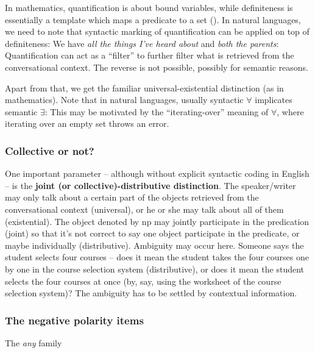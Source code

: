 \documentclass[UTF8, a4paper, oneside, scheme=plain, 12pt]{ctexbook}
\newcommand*{\concept}[1]{\textbf{#1}}
\newcommand{\form}[1]{\emph{#1}}
\begin{document}
In mathematics, quantification 
is about bound variables,
while definiteness 
is essentially a template which 
maps a predicate to a set ().
In natural languages, we need to note that 
syntactic marking of quantification can be applied on top of definiteness:
We have \form{all the things I've heard about} 
and \form{both the parents}:
Quantification can act as a ``filter'' 
to further filter what is retrieved from the conversational context.
The reverse is not possible, 
possibly for semantic reasons.

Apart from that, we get 
the familiar universal-existential distinction
(as in mathematics).
Note that in natural languages, 
usually syntactic $\forall$ implicates semantic $\exists$:
This may be motivated by the ``iterating-over'' meaning of $\forall$,
where iterating over an empty set throws an error.

\subsubsection{Collective or not?}

One important parameter -- although without explicit syntactic coding in English 
-- is the \concept{joint (or collective)-distributive distinction}.
The speaker/writer may only talk about a certain part of the objects retrieved
from the conversational context (universal), 
or he or she may talk about all of them (existential).
The object denoted by \acs{np} may jointly participate in the predication (joint)
so that it's not correct to say 
one object participate in the predicate,
or maybe individually (distributive).
Ambiguity may occur here.
Someone says the student selects four courses -- 
does it mean the student takes the four courses one by one in the course selection system
(distributive), 
or does it mean the student selects the four courses at once 
(by, say, using the worksheet of the course selection system)?
The ambiguity has to be settled by contextual information.

\subsubsection{The negative polarity items}

The \form{any} family
\end{document}
